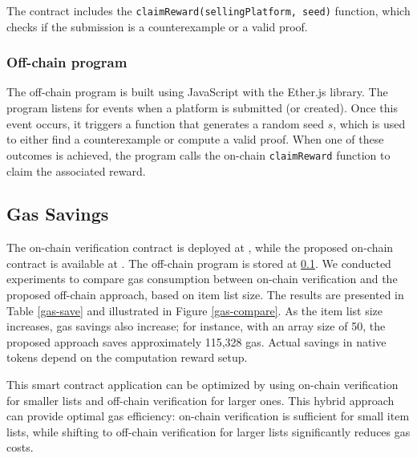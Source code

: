 \documentclass[runningheads]{llncs}
\begin{document}
The contract includes the \texttt{claimReward(sellingPlatform, seed)} function, which checks if the submission is a counterexample or a valid proof. 
\subsubsection{Off-chain program}
The off-chain program is built using JavaScript with the Ether.js library. The program listens for events when a platform is submitted (or created). Once this event occurs, it triggers a function that generates a random seed \( s \), which is used to either find a counterexample or compute a valid proof. When one of these outcomes is achieved, the program calls the on-chain \texttt{claimReward} function to claim the associated reward.
\subsection{Gas Savings}
The on-chain verification contract is deployed at \cite{}, while the proposed on-chain contract is available at \cite{}. The off-chain program is stored at \ref{}. We conducted experiments to compare gas consumption between on-chain verification and the proposed off-chain approach, based on item list size. The results are presented in Table \ref{gas-save} and illustrated in Figure \ref{gas-compare}. As the item list size increases, gas savings also increase; for instance, with an array size of 50, the proposed approach saves approximately 115,328 gas. Actual savings in native tokens depend on the computation reward setup.

This smart contract application can be optimized by using on-chain verification for smaller lists and off-chain verification for larger ones. This hybrid approach can provide optimal gas efficiency: on-chain verification is sufficient for small item lists, while shifting to off-chain verification for larger lists significantly reduces gas costs.
\end{document}
